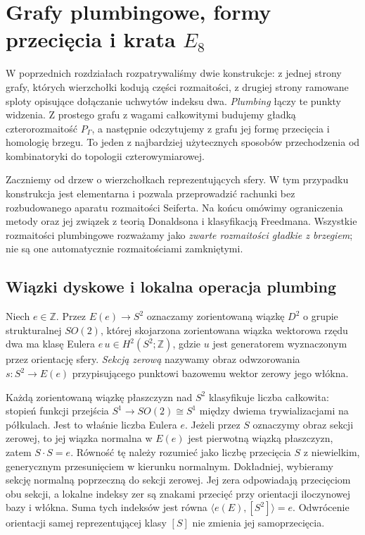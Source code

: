 \chapter{Grafy plumbingowe, formy przecięcia i krata \texorpdfstring{$E_8$}{E8}}
\label{ch:tg-plumbing}

W poprzednich rozdziałach rozpatrywaliśmy dwie konstrukcje: z jednej
strony grafy, których wierzchołki kodują części rozmaitości, z drugiej
strony ramowane sploty opisujące dołączanie uchwytów indeksu dwa.
\emph{Plumbing} łączy te punkty widzenia. Z prostego grafu z wagami
całkowitymi budujemy gładką czterorozmaitość $P_\Gamma$, a następnie
odczytujemy z grafu jej formę przecięcia i homologię brzegu.
To jeden z najbardziej użytecznych sposobów przechodzenia od
kombinatoryki do topologii czterowymiarowej.

Zaczniemy od drzew o wierzchołkach reprezentujących sfery. W tym
przypadku konstrukcja jest elementarna i pozwala przeprowadzić
rachunki bez rozbudowanego aparatu rozmaitości Seiferta. Na końcu
omówimy ograniczenia metody oraz jej związek z teorią Donaldsona
i klasyfikacją Freedmana. Wszystkie rozmaitości plumbingowe
rozważamy jako \emph{zwarte rozmaitości gładkie z brzegiem};
nie są one automatycznie rozmaitościami zamkniętymi.

\section{Wiązki dyskowe i lokalna operacja plumbing}
\label{sec:tg-plumbing-definition}

\begin{definicja}
Niech $e\in\mathbb Z$. Przez $E(e)\to S^2$ oznaczamy zorientowaną
wiązkę $D^2$ o grupie strukturalnej $SO(2)$, której skojarzona
zorientowana wiązka wektorowa rzędu dwa ma klasę Eulera
$e\,u\in H^2(S^2;\mathbb Z)$, gdzie $u$ jest generatorem
wyznaczonym przez orientację sfery. \emph{Sekcją zerową}
nazywamy obraz odwzorowania $s\colon S^2\to E(e)$ przypisującego
punktowi bazowemu wektor zerowy jego włókna.
\end{definicja}

Każdą zorientowaną wiązkę płaszczyzn nad $S^2$ klasyfikuje
liczba całkowita: stopień funkcji przejścia
$S^1\to SO(2)\cong S^1$ między dwiema trywializacjami
na półkulach. Jest to właśnie liczba Eulera $e$.
Jeżeli przez $S$ oznaczymy obraz sekcji zerowej,
to jej wiązka normalna w $E(e)$ jest pierwotną wiązką
płaszczyzn, zatem $S\cdot S=e$. Równość tę należy
rozumieć jako liczbę przecięcia $S$ z niewielkim,
generycznym przesunięciem w kierunku normalnym.
Dokładniej, wybieramy sekcję normalną poprzeczną
do sekcji zerowej. Jej zera odpowiadają przecięciom
obu sekcji, a lokalne indeksy zer są znakami
przecięć przy orientacji iloczynowej bazy i włókna.
Suma tych indeksów jest równa
$\langle e(E),[S^2]\rangle=e$.
Odwrócenie orientacji samej reprezentującej klasy
$[S]$ nie zmienia jej samoprzecięcia.

